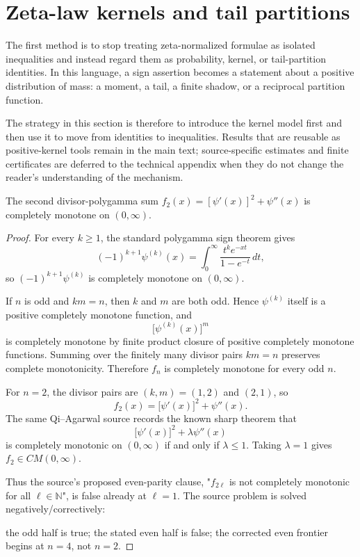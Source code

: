 \section{Zeta-law kernels and tail partitions}
The first method is to stop treating zeta-normalized formulae as isolated inequalities and instead regard them as probability, kernel, or tail-partition identities.  In this language, a sign assertion becomes a statement about a positive distribution of mass: a moment, a tail, a finite shadow, or a reciprocal partition function.

The strategy in this section is therefore to introduce the kernel model first and then use it to move from identities to inequalities.  Results that are reusable as positive-kernel tools remain in the main text; source-specific estimates and finite certificates are deferred to the technical appendix when they do not change the reader's understanding of the mechanism.
\begin{proposition}
\label{res:qa-divisor-polygamma-f2-cm}
The second divisor-polygamma sum \(f_2(x)=[\psi'(x)]^2+\psi''(x)\) is completely monotone on \((0,\infty)\).
\end{proposition}
\begin{proof}
For every \(k\ge1\), the standard polygamma sign theorem gives
\[
(-1)^{k+1}\psi^{(k)}(x)
=
\int_0^\infty \frac{t^k e^{-xt}}{1-e^{-t}}\,dt,
\]
so \((-1)^{k+1}\psi^{(k)}\) is completely monotone on \((0,\infty)\).

If \(n\) is odd and \(km=n\), then \(k\) and \(m\) are both odd. Hence \(\psi^{(k)}\) itself is a positive completely monotone function, and
\[
\bigl[\psi^{(k)}(x)\bigr]^m
\]
is completely monotone by finite product closure of positive completely monotone functions. Summing over the finitely many divisor pairs \(km=n\) preserves complete monotonicity. Therefore \(f_n\) is completely monotone for every odd \(n\).

For \(n=2\), the divisor pairs are \((k,m)=(1,2)\) and \((2,1)\), so
\[
f_2(x)=\bigl[\psi'(x)\bigr]^2+\psi''(x).
\]
The same Qi--Agarwal source records the known sharp theorem that
\[
\bigl[\psi'(x)\bigr]^2+\lambda\psi''(x)
\]
is completely monotonic on \((0,\infty)\) if and only if \(\lambda\le1\). Taking \(\lambda=1\) gives \(f_2\in CM(0,\infty)\).

Thus the source's proposed even-parity clause, "\(f_{2\ell}\) is not completely monotonic for all \(\ell\in\mathbb N\)", is false already at \(\ell=1\). The source problem is solved negatively/correctively:

the odd half is true;
the stated even half is false;
the corrected even frontier begins at \(n=4\), not \(n=2\).
\end{proof}

